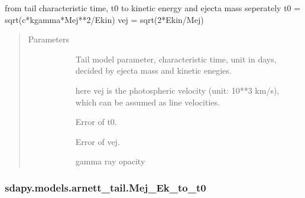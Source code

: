 \documentclass[letterpaper,10pt,english]{sphinxmanual}
\begin{document}
\begin{fulllineitems}
\label{\detokenize{generated/sdapy.models.arnett_tail.t0_to_Mej_Ek:sdapy.models.arnett_tail.t0_to_Mej_Ek}}
from tail characteristic time, t0 to kinetic energy and ejecta mass seperately
t0 = sqrt(c*kgamma*Mej**2/Ekin)
vej = sqrt(2*Ekin/Mej)
\begin{quote}\begin{description}
\item[{Parameters}] \leavevmode\begin{description}
\item[{}] \leavevmode{[}\sphinxtitleref{float}{]}
Tail model parameter, characteristic time, unit in days, decided by ejecta mass and kinetic enegies.

\item[{}] \leavevmode{[}\sphinxtitleref{float}{]}
here vej is the photospheric velocity (unit: 10**3 km/s), which can be assumed as line velocities.

\item[{}] \leavevmode{[}\sphinxtitleref{float}{]}
Error of t0.

\item[{}] \leavevmode{[}\sphinxtitleref{float}{]}
Error of vej.

\item[{}] \leavevmode{[}\sphinxtitleref{float}{]}
gamma ray opacity

\end{description}

\end{description}\end{quote}

\end{fulllineitems}



\subsubsection{sdapy.models.arnett\_tail.Mej\_Ek\_to\_t0}
\label{\detokenize{generated/sdapy.models.arnett_tail.Mej_Ek_to_t0:sdapy-models-arnett-tail-mej-ek-to-t0}}\label{\detokenize{generated/sdapy.models.arnett_tail.Mej_Ek_to_t0::doc}}
\end{document}
